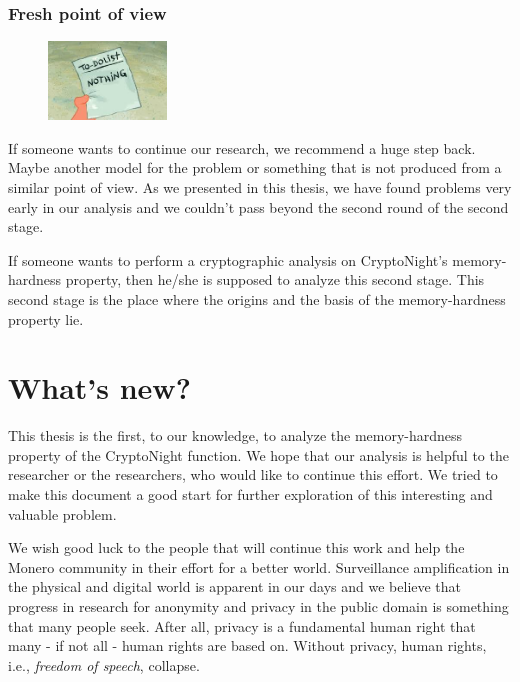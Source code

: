 \subsubsection{Fresh point of view}
\begin{figure}
\centering
\includegraphics[width=0.28\textwidth]{Images/Summary/nothing.jpg}
\end{figure}
If someone wants to continue our research, we recommend a huge step back. Maybe another model for the problem or something that is not produced from a similar point of view. As we presented in this thesis, we have found problems very early in our analysis and we couldn't pass beyond the second round of the second stage.

If someone wants to perform a cryptographic analysis on CryptoNight's memory-hardness property, then he/she is supposed to analyze this second stage. This second stage is the place where the origins and the basis of the memory-hardness property lie.
\clearpage
\pagebreak

\section{What's new?}
This thesis is the first, to our knowledge, to analyze the memory-hardness property of the CryptoNight function. We hope that our analysis is helpful to the researcher or the researchers, who would like to continue this effort. We tried to make this document a good start for further exploration of this interesting and valuable problem.

We wish good luck to the people that will continue this work and help the Monero community in their effort for a better world. Surveillance amplification in the physical and digital world is apparent in our days and we believe that progress in research for anonymity and privacy in the public domain is something that many people seek. After all, privacy is a fundamental human right that many - if not all - human rights are based on. Without privacy, human rights, i.e., \emph{freedom of speech}, collapse.
